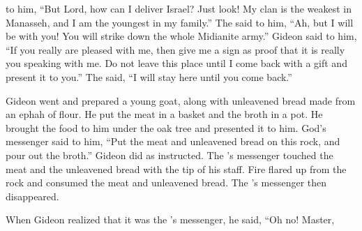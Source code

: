 {to
him, “But Lord,
how
can I deliver
Israel? Just look! My clan
is the weakest
in Manasseh,
and I
am the youngest
in my family.”
The
{}
said
to him,
“Ah, but
I will be
with
you! You will strike
down the whole Midianite army.”
Gideon said
to him,
“If
you really
are pleased
with me, then
give
me a sign
as proof that it is really you speaking
with me.
Do not
leave
this
place until
I come
back with a gift
and present it
to you.” The
{} said,
“I
will stay
here until
you come back.”
\par }{\PP {}Gideon
went
and prepared
a young
goat,
along with unleavened
bread made from an ephah
of flour.
He put
the meat
in a basket
and the broth
in a pot.
He brought
the food to him
under
the oak tree
and presented
it to him.
God’s
messenger
said
to him,
“Put
the meat
and unleavened
bread on this
rock,
and pour out
the broth.”
Gideon
did
as instructed.
The
{}’s
messenger
touched
the meat
and the unleavened
bread with the
tip
of his staff.
Fire
flared up
from
the rock
and consumed
the
meat
and unleavened
bread. The
{}’s
messenger
then
disappeared.
\par }{\PP {}When Gideon
realized
that
it was the
{}’s
messenger,
he
said,
“Oh
no! Master,

}

